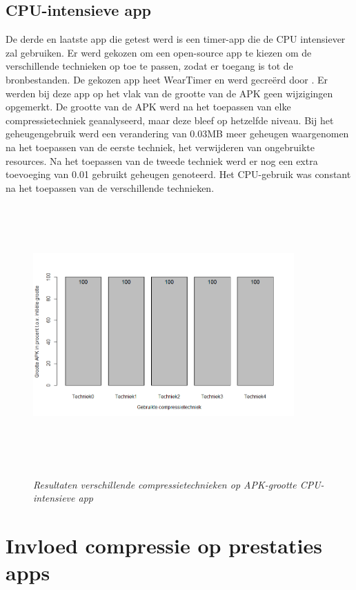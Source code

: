 \subsection{CPU-intensieve app}
\vspace{-1ex}
De derde en laatste app die getest werd is een timer-app die de CPU intensiever zal gebruiken. Er werd gekozen om een open-source app te kiezen om de verschillende technieken op toe te passen, zodat er toegang is tot de bronbestanden. De gekozen app heet WearTimer en werd gecreërd door \autocite{weartimer}.
Er werden bij deze app op het vlak van de grootte van de APK geen wijzigingen opgemerkt. De grootte van de APK werd na het toepassen van elke compressietechniek geanalyseerd, maar deze bleef op hetzelfde niveau. Bij het geheugengebruik werd een verandering van 0.03MB meer geheugen waargenomen na het toepassen van de eerste techniek, het verwijderen van ongebruikte resources. Na het toepassen van de tweede techniek werd er nog een extra toevoeging van 0.01 gebruikt geheugen genoteerd. Het CPU-gebruik was constant na het toepassen van de verschillende technieken.
\begin{figure}[H]
	\centering
	\caption{\textit{Resultaten verschillende compressietechnieken op APK-grootte CPU-intensieve app}}
	\includegraphics[width=10cm, height=10cm, keepaspectratio]{img/Rplot02}\\[.5cm]
	
\end{figure}

\section{Invloed compressie op prestaties apps}
\label{sec:invloedcompressie}

